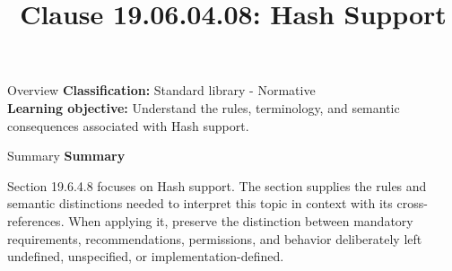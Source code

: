 \documentclass[10pt,letterpaper]{article}
\title{Clause 19.06.04.08: Hash Support}
\author{}
\date{}
\begin{document}
\maketitle
\begin{CornellOverviewBox}{Overview}
\textbf{Classification:} Standard library - Normative\\[2pt]
\textbf{Learning objective:} Understand the rules, terminology, and semantic consequences associated with Hash support.
\end{CornellOverviewBox}\begin{CornellSummaryBox}{Summary}
{\sffamily\bfseries\color{Accent} Summary}\par\vspace{3pt}Section 19.6.4.8 focuses on Hash support. The section supplies the rules and semantic distinctions needed to interpret this topic in context with its cross-references. When applying it, preserve the distinction between mandatory requirements, recommendations, permissions, and behavior deliberately left undefined, unspecified, or implementation-defined.
\end{CornellSummaryBox}
\end{document}
